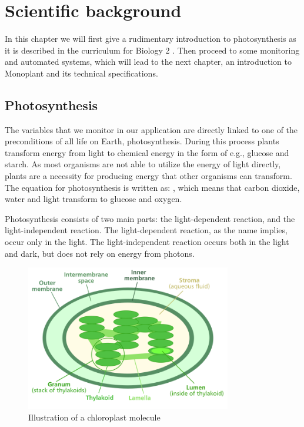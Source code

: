 \chapter{Scientific background}
\label{cha:scientificbg}
In this chapter we will first give a rudimentary introduction to photosynthesis as it is described in the curriculum for Biology 2 \citep{bios}. Then proceed to some monitoring and automated systems, which will lead to the next chapter, an introduction to Monoplant and its technical specifications.

\section{Photosynthesis}
The variables that we monitor in our application are directly linked to one of the preconditions of all life on Earth, photosynthesis. During this process plants transform energy from light to chemical energy in the form of e.g., glucose and starch. As most organisms are not able to utilize the energy of light directly, plants are a necessity for producing energy that other organisms can transform. The equation for photosynthesis is written as: , which means that carbon dioxide, water and light transform to glucose and oxygen.  

Photosynthesis consists of two main parts: the light-dependent reaction, and the light-independent reaction. The light-dependent reaction, as the name implies, occur only in the light. The light-independent reaction occurs both in the light and dark, but does not rely on energy from photons.  

\begin{figure}
\centering
\includegraphics[width=0.8\textwidth]{img/photosynthesis/Chloroplast_diagram.png}
\caption{Illustration of a chloroplast molecule \citep{wiki:chloroplast}}
\label{fig:chloroplast}
\end{figure}

